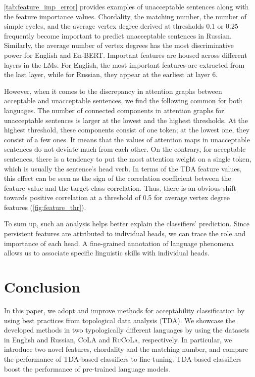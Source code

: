 \documentclass[11pt]{article}
\begin{document}
\autoref{tab:feature_imp_error} provides examples of unacceptable sentences along with the feature importance values.
Chordality, the matching number, the number of simple cycles, and the average vertex degree derived at thresholds 0.1 or 0.25 frequently become important to predict unacceptable sentences in Russian. 
Similarly, the average number of vertex degrees has the most discriminative power for English and En-BERT.
Important features are housed across different layers in the LMs.
For English, the most important features are extracted from the last layer, while for Russian, they appear at the earliest at layer 6.

However, when it comes to the discrepancy in attention graphs between acceptable and unacceptable sentences, we find the following common for both languages. 
The number of connected components in attention graphs for unacceptable sentences is larger at the lowest and the highest thresholds. 
At the highest threshold, these components consist of one token; at the lowest one, they consist of a few ones. 
It means that the values of attention maps in unacceptable sentences do not deviate much from each other. 
On the contrary, for acceptable sentences, there is a tendency to put the most attention weight on a single token, which is usually the sentence's head verb.
In terms of the TDA feature values, this effect can be seen as the sign of the correlation coefficient between the feature value and the target class correlation. 
Thus, there is an obvious shift towards positive correlation at a threshold of 0.5 for average vertex degree features (\autoref{fig:feature_thr}).

To sum up, such an analysis helps better explain the classifiers' prediction. Since persistent features are attributed to individual heads, we can trace the role and importance of each head. A fine-grained annotation of language phenomena allows us to associate specific linguistic skills with individual heads.



\section{Conclusion}

In this paper, we adopt and improve methods for acceptability classification by using best practices from topological data analysis (TDA). 
We showcase the developed methods in two typologically different languages by using the datasets in English and Russian, \textsc{CoLA} and \textsc{RuCoLa}, respectively. 
In particular, we introduce two novel features, chordality and the matching number, and compare the performance of TDA-based classifiers to fine-tuning.
TDA-based classifiers boost the performance of pre-trained language models.
\end{document}
